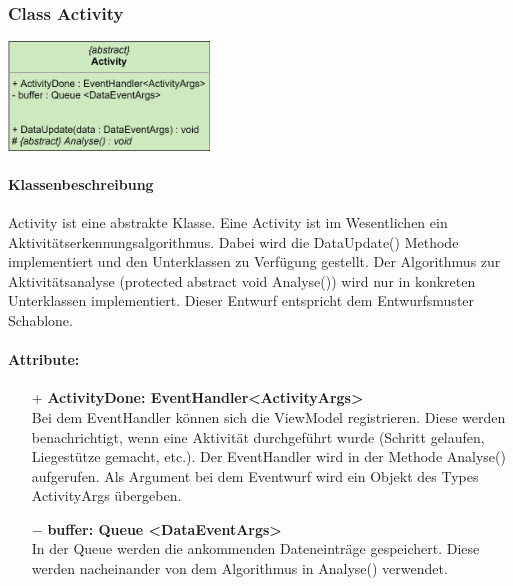 \documentclass[a4paper,12pt]{article}
\begin{document}
	
	
		\subsubsection{Class Activity}
	
	\includegraphics[width=0.4\textwidth]{bilder/EMKlassen/ActivityClass.png}
	\paragraph{Klassenbeschreibung}
	Activity ist eine abstrakte Klasse. Eine Activity ist im Wesentlichen ein Aktivitätserkennungsalgorithmus. Dabei wird die DataUpdate() Methode implementiert und den Unterklassen zu Verfügung gestellt. Der Algorithmus zur Aktivitätsanalyse (protected abstract void Analyse()) wird nur in konkreten Unterklassen implementiert. Dieser Entwurf entspricht dem Entwurfsmuster Schablone.
	
	\paragraph{Attribute:}
	\begin{itemize}
		\item[+] \textbf{ActivityDone: EventHandler<ActivityArgs>}\\Bei dem EventHandler können sich die ViewModel registrieren. Diese werden benachrichtigt, wenn eine Aktivität durchgeführt wurde (Schritt gelaufen, Liegestütze gemacht, etc.). Der EventHandler wird in der Methode Analyse() aufgerufen. Als Argument bei dem Eventwurf wird ein Objekt des Types ActivityArgs übergeben.
		\item [$-$] \textbf{buffer: Queue <DataEventArgs>}\\In der Queue werden die ankommenden Dateneinträge gespeichert. Diese werden nacheinander von dem Algorithmus in Analyse() verwendet. 
	\end{itemize}
\end{document}
